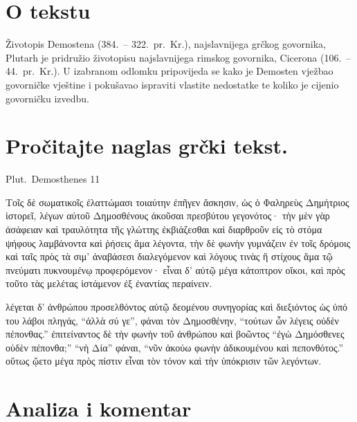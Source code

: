 


\section*{O tekstu}

Životopis Demostena (384.\ – 322.\ pr.~Kr.), najslavnijega grčkog govornika, Plutarh je pridružio životopisu najslavnijega rimskog govornika, Cicerona (106.\ – 44.\ pr.~Kr.). U izabranom odlomku pripovijeda se kako je Demosten vježbao govorničke vještine i pokušavao ispraviti vlastite nedostatke te koliko je cijenio govorničku izvedbu.


\section*{Pročitajte naglas grčki tekst.}
Plut.\ Demosthenes 11

\medskip

{\large
\begin{greek}

\noindent Τοῖς δὲ σωματικοῖς ἐλαττώμασι τοιαύτην ἐπῆγεν ἄσκησιν, ὡς ὁ Φαληρεὺς Δημήτριος ἱστορεῖ, λέγων αὐτοῦ Δημοσθένους ἀκοῦσαι πρεσβύτου γεγονότος· τὴν μὲν γὰρ ἀσάφειαν καὶ τραυλότητα τῆς γλώττης ἐκβιάζεσθαι καὶ διαρθροῦν εἰς τὸ στόμα ψήφους λαμβάνοντα καὶ ῥήσεις ἅμα λέγοντα, τὴν δὲ φωνὴν γυμνάζειν ἐν τοῖς δρόμοις καὶ ταῖς πρὸς τὰ σιμ' ἀναβάσεσι διαλεγόμενον καὶ λόγους τινὰς ἢ στίχους ἅμα τῷ πνεύματι πυκνουμένῳ προφερόμενον· εἶναι δ' αὐτῷ μέγα κάτοπτρον οἴκοι, καὶ πρὸς τοῦτο τὰς μελέτας ἱστάμενον ἐξ ἐναντίας περαίνειν. 

λέγεται δ' ἀνθρώπου προσελθόντος αὐτῷ δεομένου συνηγορίας καὶ διεξιόντος ὡς ὑπό του λάβοι πληγάς, ``ἀλλὰ σύ γε'', φάναι τὸν Δημοσθένην, ``τούτων ὧν λέγεις οὐδὲν πέπονθας.'' ἐπιτείναντος δὲ τὴν φωνὴν τοῦ ἀνθρώπου καὶ βοῶντος ``ἐγὼ Δημόσθενες οὐδὲν πέπονθα;'' ``νὴ Δία'' φάναι, ``νῦν ἀκούω φωνὴν ἀδικουμένου καὶ πεπονθότος.'' οὕτως ᾤετο μέγα πρὸς πίστιν εἶναι τὸν τόνον καὶ τὴν ὑπόκρισιν τῶν λεγόντων.

\end{greek}

}

\section*{Analiza i komentar}



